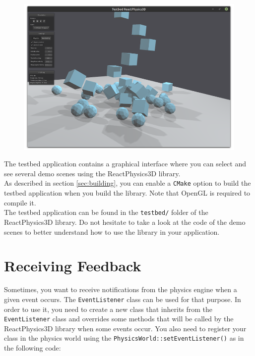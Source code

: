 \documentclass[a4paper,12pt]{article}
\begin{document}
    \begin{figure}[!ht]
        \centering
	  \includegraphics[scale=0.5]{testbed.png}
        \label{fig:testbed}
    \end{figure}

    The testbed application contains a graphical interface where you can select and see several demo scenes using the ReactPhysics3D library. \\

    As described in section \ref{sec:building}, you can enable a \texttt{CMake} option to build the testbed application when you build the library.
    Note that OpenGL is required to compile it. \\

    The testbed application can be found in the \texttt{testbed/} folder of
    the ReactPhysics3D library. Do not hesitate to take a look at the code of the demo scenes to better understand how
    to use the library in your application. \\

    \section{Receiving Feedback}
    \label{sec:receiving_feedback}

    Sometimes, you want to receive notifications from the physics engine when a given event occurs. The \texttt{EventListener} class can be used for that
    purpose. In order to use it, you need to create a new class that inherits from the \texttt{EventListener} class and overrides some methods that will
    be called by the ReactPhysics3D library when some events occur. You also need to register your class in the physics world using the
    \texttt{PhysicsWorld::setEventListener()} as in the following code: \\
\end{document}
